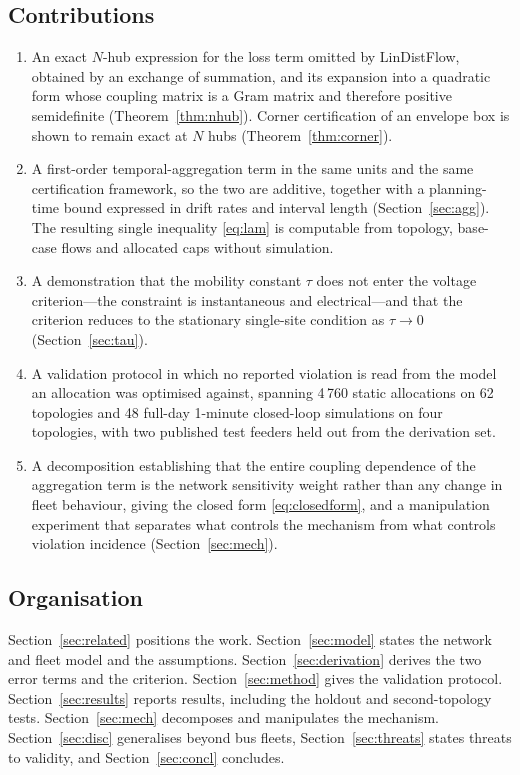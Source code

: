 \documentclass[lettersize,journal]{IEEEtran}
\begin{document}
\subsection{Contributions}
\begin{enumerate}
\item An exact $N$-hub expression for the loss term omitted by LinDistFlow,
obtained by an exchange of summation, and its expansion into a quadratic form
whose coupling matrix is a Gram matrix and therefore positive semidefinite
(Theorem~\ref{thm:nhub}). Corner certification of an envelope box is shown to
remain exact at $N$ hubs (Theorem~\ref{thm:corner}).
\item A first-order temporal-aggregation term in the same units and the same
certification framework, so the two are additive, together with a
planning-time bound expressed in drift rates and interval length
(Section~\ref{sec:agg}). The resulting single inequality \eqref{eq:lam} is
computable from topology, base-case flows and allocated caps without
simulation.
\item A demonstration that the mobility constant $\tau$ does not enter the
voltage criterion---the constraint is instantaneous and electrical---and that
the criterion reduces to the stationary single-site condition as
$\tau\!\to\!0$ (Section~\ref{sec:tau}).
\item A validation protocol in which no reported violation is read from the
model an allocation was optimised against, spanning 4\,760 static allocations
on 62 topologies and 48 full-day 1-minute closed-loop simulations on four
topologies, with two published test feeders held out from the derivation set.
\item A decomposition establishing that the entire coupling dependence of the
aggregation term is the network sensitivity weight rather than any change in
fleet behaviour, giving the closed form \eqref{eq:closedform}, and a
manipulation experiment that separates what controls the mechanism from what
controls violation incidence (Section~\ref{sec:mech}).
\end{enumerate}

\subsection{Organisation}
Section~\ref{sec:related} positions the work. Section~\ref{sec:model} states
the network and fleet model and the assumptions. Section~\ref{sec:derivation}
derives the two error terms and the criterion. Section~\ref{sec:method} gives
the validation protocol. Section~\ref{sec:results} reports results, including
the holdout and second-topology tests. Section~\ref{sec:mech} decomposes and
manipulates the mechanism. Section~\ref{sec:disc} generalises beyond bus
fleets, Section~\ref{sec:threats} states threats to validity, and
Section~\ref{sec:concl} concludes.
\end{document}
